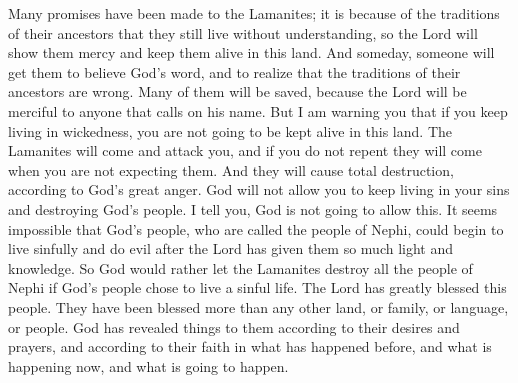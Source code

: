Many promises have been made to the Lamanites; it is because of the traditions of their ancestors that they still live without understanding, so the Lord will show them mercy and keep them alive in this land.
\bverse \iffalse And at some period of time they will be brought to believe in his word, and to know of the incorrectness of the traditions of their fathers; and many of them will be saved, for the Lord will be merciful unto all who call on his name. \fi
And someday, someone will get them to believe God's word, and to realize that the traditions of their ancestors are wrong. Many of them will be saved, because the Lord will be merciful to anyone that calls on his name.
\bverse \iffalse But behold, I say unto you that if ye persist in your wickedness that your days shall not be prolonged in the land, for the Lamanites shall be sent upon you; and if ye repent not they shall come in a time when you know not, and ye shall be visited with utter destruction; and it shall be according to the fierce anger of the Lord. \fi
But I am warning you that if you keep living in wickedness, you are not going to be kept alive in this land. The Lamanites will come and attack you, and if you do not repent they will come when you are not expecting them. And they will cause total destruction, according to God's great anger.
\bverse \iffalse For he will not suffer you that ye shall live in your iniquities, to destroy his people. I say unto you, Nay; he would rather suffer that the Lamanites might destroy all his people who are called the people of Nephi, if it were possible that they could fall into sins and transgressions, after having had so much light and so much knowledge given unto them of the Lord their God; \fi
God will not allow you to keep living in your sins and destroying God's people. I tell you, God is not going to allow this. It seems impossible that God's people, who are called the people of Nephi, could begin to live sinfully and do evil after the Lord has given them so much light and knowledge. So God would rather let the Lamanites destroy all the people of Nephi if God's people chose to live a sinful life.
\bverse \iffalse Yea, after having been such a highly favored people of the Lord; yea, after having been favored above every other nation, kindred, tongue, or people; after having had all things made known unto them, according to their desires, and their faith, and prayers, of that which has been, and which is, and which is to come; \fi
The Lord has greatly blessed this people. They have been blessed more than any other land, or family, or language, or people. God has revealed things to them according to their desires and prayers, and according to their faith in what has happened before, and what is happening now, and what is going to happen.
